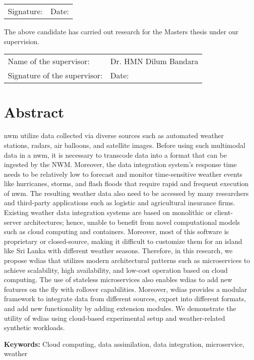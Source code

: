 \documentclass[a4paper,oneside,12pt]{report}
\begin{document}
\vspace{0.5in}
\noindent
\begin{tabu} to 1.0\textwidth { X[6.5,l] X[3.5,l] }
  Signature: & Date:
\end{tabu}



\vspace{0.5in}
\noindent
The above candidate has carried out research for the Masters thesis under our supervision.


\vspace{0.5in}
\noindent
\begin{tabu} to 1.0\textwidth { X[6.5,l] X[3.5,l] }
  Name of the supervisor: & Dr. HMN Dilum Bandara\\ [2.5ex]
  Signature of the supervisor: & Date:
\end{tabu}

\restoregeometry
\normalsize

{ 

\chapter*{Abstract}

\acrfull{nwm} utilize data collected via diverse sources such as automated weather stations, radars, air balloons, and satellite images. Before using such multimodal data in a \acrshort{nwm}, it is necessary to transcode data into a format that can be ingested by the NWM. Moreover, the data integration system's response time needs to be relatively low to forecast and monitor time-sensitive weather events like hurricanes, storms, and flash floods that require rapid and frequent execution of \acrshort{nwm}. The resulting weather data also need to be accessed by many researchers and third-party applications such as logistic and agricultural insurance firms.
Existing weather data integration systems are based on monolithic or client-server architectures; hence, unable to benefit from novel computational models such as cloud computing and containers. Moreover, most of this software is proprietary or closed-source, making it difficult to customize them for an island like Sri Lanka with different weather seasons.
Therefore, in this research, we propose \acrfull{wdias} that utilizes modern architectural patterns such as microservices to achieve scalability, high availability, and low-cost operation based on cloud computing. The use of stateless microservices also enables \acrshort{wdias} to add new features on the fly with rollover capabilities. Moreover, \acrshort{wdias} provides a modular framework to integrate data from different sources, export into different formats, and add new functionality by adding extension modules.
We demonstrate the utility of \acrshort{wdias} using cloud-based experimental setup and weather-related synthetic workloads.

\vspace{4mm}

\textbf{Keywords:} Cloud computing, data assimilation, data integration, microservice, weather
}
\end{document}

